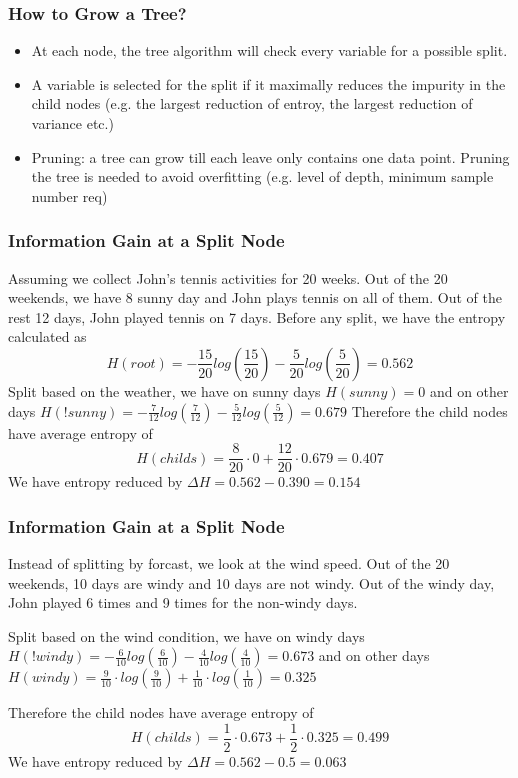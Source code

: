 \documentclass[notheorems, aspectratio=54]{beamer}
\begin{document}
\begin{frame}
\frametitle{How to Grow a Tree?}
\begin{itemize}
\item At each node, the tree algorithm will check every variable for a possible split. 
\item A variable is selected for the split if it maximally reduces the impurity in the child nodes (e.g. the largest reduction of entroy, the largest reduction of variance etc.)
\item Pruning: a tree can grow till each leave only contains one data point. Pruning the tree is needed to avoid overfitting (e.g. level of depth, minimum sample number req) 
\end{itemize}
\end{frame}

\begin{frame}
\frametitle{Information Gain at a Split Node}
Assuming we collect John's tennis activities for 20 weeks. Out of the 20 weekends, we have 8 sunny day and John plays tennis on all of them. Out of the rest 12 days, John played tennis on 7 days. 
Before any split, we have the entropy calculated as 
    $$
    H(root)=-\frac{15}{20}log(\frac{15}{20})-\frac{5}{20}log(\frac{5}{20})=0.562
    $$
Split based on the weather, we have on sunny days
$
H(sunny)=0
$
and on other days
$
H(!sunny)=-\frac{7}{12}log(\frac{7}{12})-\frac{5}{12}log(\frac{5}{12})=0.679
$
Therefore the child nodes have average entropy of 
$$
H(childs)=\frac{8}{20}\cdot 0+\frac{12}{20}\cdot 0.679=0.407
$$
We have entropy reduced by $\Delta H=0.562-0.390=0.154$
\end{frame}

\begin{frame}
\frametitle{Information Gain at a Split Node}
Instead of splitting by forcast, we look at the wind speed. Out of the 20 weekends, 10 days are windy and 10 days are not windy. Out of the windy day, John played 6 times and 9 times for the non-windy days.

Split based on the wind condition, we have on windy days
$
H(!windy)=-\frac{6}{10}log(\frac{6}{10})-\frac{4}{10}log(\frac{4}{10})=0.673
$
and on other days
$
H(windy)=\frac{9}{10}\cdot log(\frac{9}{10})+\frac{1}{10}\cdot log(\frac{1}{10})=0.325
$

Therefore the child nodes have average entropy of 
$$
H(childs)=\frac{1}{2}\cdot 0.673+\frac{1}{2}\cdot 0.325=0.499
$$
We have entropy reduced by $\Delta H=0.562-0.5=0.063$
\end{frame}
\end{document}
